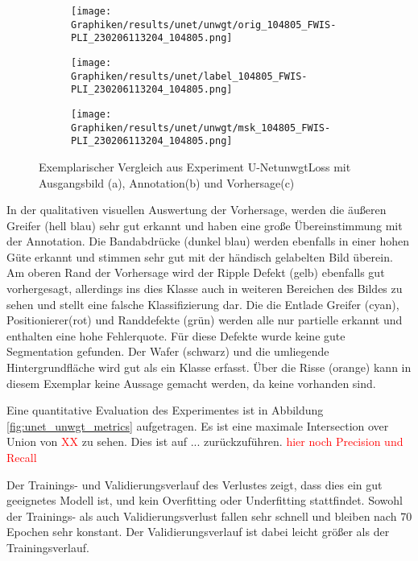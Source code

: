     \begin{figure}[h!]
        \begin{subfigure}[h]{0.32\linewidth}
            \texttt{[image: Graphiken/results/unet/unwgt/orig\_104805\_FWIS-PLI\_230206113204\_104805.png]}
            \caption{}
        \end{subfigure}
        \hfill
        \begin{subfigure}[h]{0.32\linewidth}
            \texttt{[image: Graphiken/results/unet/label\_104805\_FWIS-PLI\_230206113204\_104805.png]}
            \caption{}
        \end{subfigure}%
        \hfill
        \begin{subfigure}[h]{0.32\linewidth}
            \texttt{[image: Graphiken/results/unet/unwgt/msk\_104805\_FWIS-PLI\_230206113204\_104805.png]}
            \caption{}
        \end{subfigure}%
        \caption{Exemplarischer Vergleich aus Experiment U-Net\textunderscore unwgtLoss mit Ausgangsbild (a), Annotation(b) und Vorhersage(c)}
        \label{fig:unet_unwgt_pred}
    \end{figure}
    
  In der qualitativen visuellen Auswertung der Vorhersage, werden die äußeren Greifer (hell blau) sehr gut erkannt und haben eine große Übereinstimmung mit der Annotation. Die Bandabdrücke (dunkel blau) werden ebenfalls in einer hohen Güte erkannt und stimmen sehr gut mit der händisch gelabelten Bild überein. Am oberen Rand der Vorhersage wird der Ripple Defekt (gelb) ebenfalls gut vorhergesagt, allerdings ins dies Klasse auch in weiteren Bereichen des Bildes zu sehen und stellt eine falsche Klassifizierung dar. Die die Entlade Greifer (cyan), Positionierer(rot) und Randdefekte (grün) werden alle nur partielle erkannt und enthalten eine hohe Fehlerquote. Für diese Defekte wurde keine gute Segmentation gefunden. Der Wafer (schwarz) und die umliegende Hintergrundfläche wird gut als ein Klasse erfasst. Über die Risse (orange) kann in diesem Exemplar keine Aussage gemacht werden, da keine vorhanden sind. 
  



  Eine quantitative Evaluation des Experimentes ist in Abbildung \ref{fig:unet_unwgt_metrics} aufgetragen. Es ist eine maximale Intersection over Union von \textcolor{red}{XX} zu sehen. Dies ist auf ... zurückzuführen. \textcolor{red}{hier noch Precision und Recall}

  Der Trainings- und Validierungsverlauf des Verlustes zeigt, dass dies ein gut geeignetes Modell ist, und kein Overfitting oder Underfitting stattfindet. Sowohl der Trainings- als auch Validierungsverlust fallen sehr schnell und bleiben nach 70 Epochen sehr konstant. Der Validierungsverlauf ist dabei leicht größer als der Trainingsverlauf.   
  
